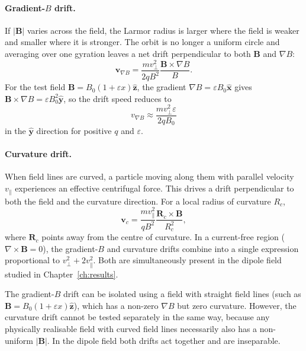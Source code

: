 \paragraph{Gradient-$B$ drift.}
If $|\mathbf{B}|$ varies across the field, the Larmor radius is larger
where the field is weaker and smaller where it is stronger. The orbit is
no longer a uniform circle and averaging over one gyration leaves a net
drift perpendicular to both $\mathbf{B}$ and $\nabla B$:
\begin{equation}
  \mathbf{v}_{\nabla B} = \frac{m v_\perp^2}{2qB^2}
    \frac{\mathbf{B} \times \nabla B}{B}.
  \label{eq:gradb}
\end{equation}
For the test field
$\mathbf{B} = B_0(1 + \varepsilon x)\hat{\mathbf{z}}$, the gradient
$\nabla B = \varepsilon B_0 \hat{\mathbf{x}}$ gives
$\mathbf{B} \times \nabla B = \varepsilon B_0^2 \hat{\mathbf{y}}$, so
the drift speed reduces to
\begin{equation}
  v_{\nabla B} \approx \frac{m v_\perp^2 \varepsilon}{2qB_0}
  \label{eq:gradb_test}
\end{equation}
in the $\hat{\mathbf{y}}$ direction for positive $q$ and $\varepsilon$.

\paragraph{Curvature drift.}
When field lines are curved, a particle moving along them with parallel
velocity $v_\parallel$ experiences an effective centrifugal force. This
drives a drift perpendicular to both the field and the curvature
direction. For a local radius of curvature $R_c$,
\begin{equation}
  \mathbf{v}_c = \frac{m v_\parallel^2}{qB^2}
    \frac{\mathbf{R}_c \times \mathbf{B}}{R_c^2},
  \label{eq:curv}
\end{equation}
where $\mathbf{R}_c$ points away from the centre of curvature. In a
current-free region ($\nabla \times \mathbf{B} = 0$), the gradient-$B$
and curvature drifts combine into a single expression proportional to
$v_\perp^2 + 2v_\parallel^2$. Both are simultaneously present in the
dipole field studied in Chapter~\ref{ch:results}.

The gradient-$B$ drift can be isolated using a field with straight field
lines (such as $\mathbf{B} = B_0(1+\varepsilon x)\hat{\mathbf{z}}$),
which has a non-zero $\nabla B$ but zero curvature. However, the
curvature drift cannot be tested separately in the same way, because any
physically realisable field with curved field lines necessarily also has
a non-uniform $|\mathbf{B}|$. In the dipole field both drifts act
together and are inseparable.

